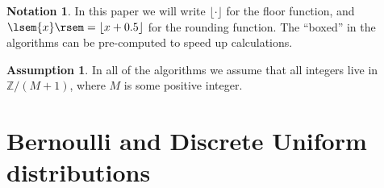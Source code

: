 \documentclass{article}
\theoremstyle{definition} %
\newtheorem{assumption}{Assumption}
\newtheorem*{notation}{Notation}
\newcommand{\floor}[1]{\lfloor{#1}\rfloor}
\newcommand{\round}[1]{\lsem{#1}\rsem}
\newcommand{\Integers}{\mathbb{Z}}  %
\begin{document}
\begin{notation}
    In this paper we will write $\floor{\cdot }$ for the floor function, and $\round{x} = \floor{x + 0.5}$ for the rounding function.
    The ``boxed''  in the algorithms can be pre-computed to speed up calculations.
\end{notation}

\begin{assumption}
    In all of the algorithms we assume that all integers live in $\Integers / (M + 1)$, where $M$ is some positive integer.
\end{assumption}


\section{Bernoulli and Discrete Uniform distributions}
\end{document}
